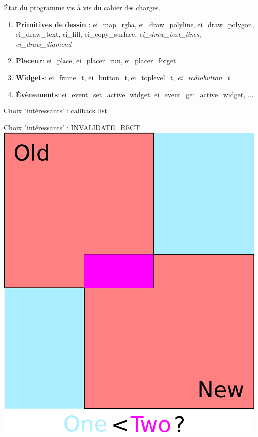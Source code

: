 \documentclass[10pt]{beamer}
\begin{document}
\begin{frame}{État du programme vis à vis du cahier des charges.}

    \begin{enumerate}
        \item \textbf{Primitives de dessin} : ei\_map\_rgba, ei\_draw\_polyline, ei\_draw\_polygon, ei\_draw\_text, ei\_fill, ei\_copy\_surface, \emph{ei\_draw\_text\_lines}, \emph{ei\_draw\_diamond}
        \item \textbf{Placeur}: ei\_place, ei\_placer\_run, ei\_placer\_forget
        \item \textbf{Widgets}: ei\_frame\_t, ei\_button\_t, ei\_toplevel\_t, \emph{ei\_radiobutton\_t}
        \item \textbf{Évènements}: ei\_event\_set\_active\_widget, ei\_event\_get\_active\_widget, ...
    \end{enumerate}

\end{frame}
\lstset{
basicstyle=\footnotesize, frame=tb,
xleftmargin=.2\textwidth, xrightmargin=.2\textwidth
}
\begin{frame}{Choix "intéressants" : callback list}
    
\end{frame}

\begin{frame}{Choix "intéressants" : INVALIDATE\_RECT}
    \centering
    \includegraphics[scale=0.5]{drawing.eps}
\end{frame}
\end{document}
